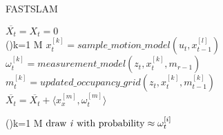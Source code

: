 \documentclass[a4paper,11pt, hidelinks]{article}
\begin{document}
\begin{algorithm}
\caption{F{\footnotesize AST}SLAM}
\SetAlgoNoLine

\SetNlSty{}{}{:}


\BlankLine
\nl $\overline{X_t} = X_t = 0$ \\
\nl \For(){k=1  M}{
    \nl $x_t^{[k]} = sample\_motion\_model(u_t,x_{t-1}^{[l]})$ \\
    \nl $\omega_t^{[k]} = measurement\_model(z_t,x_t^{[k]},m_{r-1})$ \\
    \nl $m_t^{[k]} = updated\_occupancy\_grid(z_t,x_t^{[k]},m_{t-1}^{[k]})$ \\
    \nl $\overline{X_t} = \overline{X_t} + \langle x_x^{[m]}, \omega_t^{[m]} \rangle$
}

\nl \For(){k=1  M}{
    \nl $\mbox{draw \emph{i} with probability} \approx \omega_t^{[i]}$ \\
}


\end{algorithm}
\end{document}
